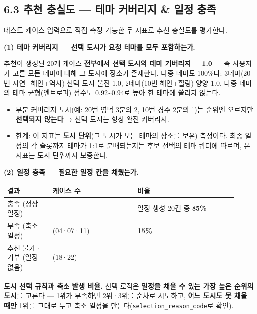 \documentclass[11pt,a4paper]{article}
\newcommand{\DocNeedspace}[1]{\par\ifdim\dimexpr\pagegoal-\pagetotal\relax<#1\newpage\fi}
\providecommand{\tightlist}{\setlength{\itemsep}{0pt}\setlength{\parskip}{0pt}}
\begin{document}
\DocNeedspace{6\baselineskip}
\subsection*{6.3 추천 충실도 --- 테마 커버리지 \& 일정 충족}

테스트 케이스 입력으로 직접 측정 가능한 두 지표로 추천 충실도를 평가한다.

\textbf{(1) 테마 커버리지 --- 선택 도시가 요청 테마를 모두 포함하는가.}

추천이 생성된 20개 케이스 \textbf{전부에서 선택 도시의 테마 커버리지 = 1.0} --- 즉 사용자가 고른 모든 테마에 대해 그 도시에 장소가 존재한다. 다중 테마도 100\%다: 3테마(20번 자연+해안+역사) 선택 도시 울진 1.0, 2테마(10번 해안+힐링) 양양 1.0. 다중 테마의 테마 균형(엔트로피) 점수도 0.92\textasciitilde0.94로 높아 한 테마에 쏠리지 않는다.

\begin{itemize}
\tightlist
\item
  부분 커버리지 도시(예: 20번 영덕 3분의 2, 10번 경주 2분의 1)는 순위엔 오르지만 \textbf{선택되지 않는다} → 선택 도시는 항상 완전 커버리지.
\item
  한계: 이 지표는 \textbf{도시 단위}(그 도시가 모든 테마의 장소를 보유) 측정이다. 최종 일정의 각 슬롯까지 테마가 1:1로 분배되는지는 후보 선택의 테마 쿼터에 따르며, 본 지표는 도시 단위까지 보증한다.
\end{itemize}

\textbf{(2) 일정 충족 --- 필요한 일정 칸을 채웠는가.}

\begin{small}
\begin{longtable}{@{}>{\RaggedRight\arraybackslash}m{0.180\linewidth}>{\RaggedRight\arraybackslash}m{0.340\linewidth}>{\RaggedRight\arraybackslash}m{0.400\linewidth}@{}}
\toprule\noalign{}
결과 & 케이스 수 & 비율 \\
\midrule\noalign{}
\endhead
\bottomrule\noalign{}
\endlastfoot
충족 (정상 일정) & 17 & 일정 생성 20건 중 \textbf{85\%} \\
부족 (축소 일정) & 3 (04·07·11) & \textbf{15\%} \\
추천 불가·거부 (일정 없음) & 2 (18·22) & --- \\
\end{longtable}
\end{small}

\textbf{도시 선택 규칙과 축소 발생 비율.} 선택 로직은 \textbf{일정을 채울 수 있는 가장 높은 순위의 도시}를 고른다 --- 1위가 부족하면 2위·3위를 순차로 시도하고, \textbf{어느 도시도 못 채울 때만} 1위를 그대로 두고 축소 일정을 만든다(\texttt{selection\_\allowbreak{}reason\_\allowbreak{}code}로 확인).
\end{document}
